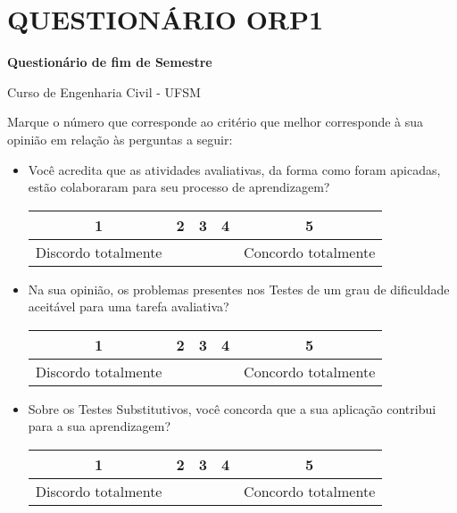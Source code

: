 
\chapter{QUESTIONÁRIO ORP1} \label{ch:questORP1}
\begin{center}
    \textbf{Questionário de fim de Semestre}

    
    Curso de Engenharia Civil - UFSM
\end{center}

Marque o número que corresponde ao critério que melhor corresponde à sua opinião em relação às perguntas a seguir:

\begin{itemize}
    \item Você acredita que as atividades avaliativas, da forma como foram apicadas, estão colaboraram para seu processo de aprendizagem?

\begin{minipage}{\linewidth}
\centering
\begin{tabular}{|c|c|c|c|c|}
\hline
\textbf{1} & \textbf{2} & \textbf{3} & \textbf{4} & \textbf{5} \\
\hline
Discordo totalmente & \phantom{aaaaaaaa} & \phantom{aaaaaaaa} & \phantom{aaaaaaaa} & Concordo totalmente \\
\hline
\end{tabular}
\end{minipage}

    \item Na sua opinião, os problemas presentes nos Testes de um grau de dificuldade aceitável para uma tarefa avaliativa?
    
\begin{minipage}{\linewidth}
\centering
\begin{tabular}{|c|c|c|c|c|}
\hline
\textbf{1} & \textbf{2} & \textbf{3} & \textbf{4} & \textbf{5} \\
\hline
Discordo totalmente & \phantom{aaaaaaaa} & \phantom{aaaaaaaa} & \phantom{aaaaaaaa} & Concordo totalmente \\
\hline
\end{tabular}
\end{minipage}

    \item Sobre os Testes Substitutivos, você concorda que a sua aplicação contribui para a sua aprendizagem?

\begin{minipage}{\linewidth}
\centering
\begin{tabular}{|c|c|c|c|c|}
\hline
\textbf{1} & \textbf{2} & \textbf{3} & \textbf{4} & \textbf{5} \\
\hline
Discordo totalmente & \phantom{aaaaaaaa} & \phantom{aaaaaaaa} & \phantom{aaaaaaaa} & Concordo totalmente \\
\hline
\end{tabular}
\end{minipage}


\end{itemize}
